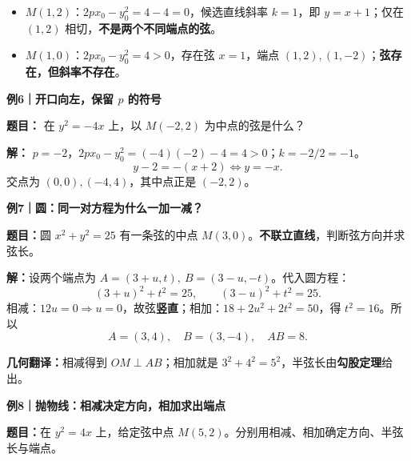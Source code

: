 \begin{examplebox}
\begin{itemize}[leftmargin=*,itemsep=0.25em]
 \item $M(1,2)$：$2px_0-y_0^2=4-4=0$，候选直线斜率 $k=1$，即 $y=x+1$；仅在 $(1,2)$ 相切，\textbf{不是两个不同端点的弦}。
 \item $M(1,0)$：$2px_0-y_0^2=4>0$，存在弦 $x=1$，端点 $(1,2),(1,-2)$；\textbf{弦存在，但斜率不存在}。
\end{itemize}
\par\medskip
\begin{minipage}{\linewidth}
\noindent
\textbf{\textcolor{CExample}{例6｜开口向左，保留 $p$ 的符号}}\par\nobreak\smallskip
\par\noindent\textbf{题目：} 在 $y^2=-4x$ 上，以 $M(-2,2)$ 为中点的弦是什么？
\par
\end{minipage}
\par\smallskip
\par\noindent\textbf{解：} $p=-2$，$2px_0-y_0^2=(-4)(-2)-4=4>0$；$k=-2/2=-1$。
\[
 \boxed{y-2=-(x+2)\Longleftrightarrow y=-x}.
\]
交点为 $(0,0),(-4,4)$，其中点正是 $(-2,2)$。
\par\medskip
\begin{minipage}{\linewidth}
\noindent
\textbf{\textcolor{CExample}{例7｜圆：同一对方程为什么一加一减？}}\par\nobreak\smallskip
\par\noindent\textbf{题目：}圆 $x^2+y^2=25$ 有一条弦的中点 $M(3,0)$。\textbf{不联立直线}，判断弦方向并求弦长。

\par
\end{minipage}
\par\smallskip
\par\noindent\textbf{解：}设两个端点为 $A=(3+u,t),\ B=(3-u,-t)$。代入圆方程：
\[
(3+u)^2+t^2=25,\qquad (3-u)^2+t^2=25.
\]
相减：$12u=0\Rightarrow u=0$，故弦\textbf{竖直}；相加：$18+2u^2+2t^2=50$，得 $t^2=16$。所以
\[
\boxed{A=(3,4),\quad B=(3,-4),\quad AB=8}.
\]
\par\noindent\textbf{几何翻译：}相减得到 $OM\perp AB$；相加就是 $3^2+4^2=5^2$，半弦长由\textbf{勾股定理}给出。
\par\medskip
\begin{minipage}{\linewidth}
\noindent
\textbf{\textcolor{CExample}{例8｜抛物线：相减决定方向，相加求出端点}}\par\nobreak\smallskip
\par\noindent\textbf{题目：}在 $y^2=4x$ 上，给定弦中点 $M(5,2)$。分别用相减、相加确定方向、半弦长与端点。


\end{minipage}
\end{examplebox}
